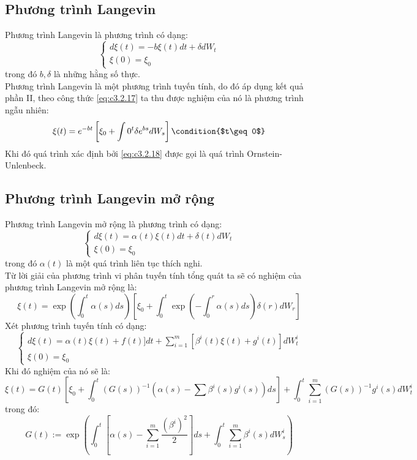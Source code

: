 \documentclass[a4paper]{article}
\numberwithin{equation}{section}
\begin{document}
\subsection{Phương trình Langevin}
Phương trình Langevin là phương trình có dạng:
\begin{equation}\label{eq:c3.2.17}
	\begin{cases}
		d\xi(t)=-b\xi(t)dt+\delta dW_t\\
		\xi(0)=\xi_0
	\end{cases}
\end{equation}
trong đó $b,\delta$ là những hằng số thực.\\
Phương trình Langevin là một phương trình tuyến tính, do đó áp dụng kết quả phần II, theo công thức \eqref{eq:c3.2.17} ta thu được nghiệm của nó là phương trình ngẫu nhiên:
\begin{equation}\label{eq:c3.2.18}
	\xi(t)=e^{-bt}\left[\xi_0+\int{0}^{t}\delta e^{bs}dW_s \right] \condition{$t\geq 0$}
\end{equation}
Khi đó quá trình xác định bởi \eqref{eq:c3.2.18} được gọi là quá trình Ornstein-Unlenbeck.\\
\subsection{Phương trình Langevin mở rộng}
Phương trình Langevin mở rộng là phương trình có dạng:
\begin{equation}\label{eq:c3.2.19}
	\begin{cases}
		d\xi(t)=\alpha(t)\xi(t)dt+\delta(t)dW_t\\
		\xi(0)=\xi_0
	\end{cases}
\end{equation}
trong đó $\alpha(t)$ là một quá trình liên tục thích nghi.\\
Từ lời giải của phương trình vi phân tuyến tính tổng quát ta sẽ có nghiệm của phương trình Langevin mở rộng là:
\begin{equation}\label{eq:c3.2.20}
	\xi(t)=\exp\left(\int_{0}^{t}\alpha(s)ds\right)\left[\xi_0+\int_{0}^{t}\exp\left(-\int_{0}^{r}\alpha(s)ds \right)\delta(r)dW_r \right]
\end{equation}
Xét phương trình tuyến tính có dạng:
\begin{equation}\label{eq:c3.2.21}
	\begin{cases}
		d\xi(t)=\alpha(t)\xi(t)+f(t)]dt+\sum\limits_{i=1}^{m}\left[\beta^i(t)\xi(t)+g^i(t)\right]dW_t^i\\
		\xi(0)=\xi_0
	\end{cases}
\end{equation}
Khi đó nghiệm của nó sẽ là:
\begin{dmath}\label{eq:c3.2.22}
\xi(t)=G(t)\left[\xi_0+\int_{0}^{t}\left(G(s)\right)^{-1}\left(\alpha(s)-\sum\beta^i(s)g^i(s)\right)ds \right]+\int_{0}^{t}\sum\limits_{i=1}^{m}(G(s))^{-1}g^i(s)dW_t^i	
\end{dmath}
trong đó:
\begin{equation*}
	G(t):=\exp\left(\int_{0}^{t}\left[\alpha(s)-\sum_{i=1}^{m}\dfrac{(\beta^i)^2}{2} \right]ds+\int_{0}^{t}\sum_{i=1}^{m}\beta^i(s)dW_s^i \right)
\end{equation*}
\pagebreak
\end{document}
